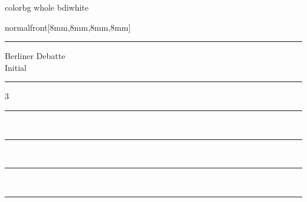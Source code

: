 \documentclass[
    coverwidth=160mm,
    coverheight=227mm,
    spinewidth=9mm,
    markcolor=black,
    marklength=8mm,
    trimmed=true,
    ]
    {bookcover}
\begin{document}
    \begin{bookcover}
        \begin{bookcoverelement}{color}{bg whole}
        bdiwhite
        \end{bookcoverelement}
        
        \begin{bookcoverelement}{normal}{front}[8mm,8mm,8mm,8mm]
            \hrule
            \begin{center}
                {\bdilogo Berliner Debatte\\Initial\par}
            \end{center}
            \hrule
            \begin{center}
                \vspace{10pt}
                {\bdinumber \color{bdired} 3}
                \vspace{10pt}
            \end{center}
       
            \par\noindent\rule{72mm}{0.4pt}\\
            {\bdivolume{\color{bdired} {33. Jg. 2022}}}
            \begin{center}
                \bdicover {\bfseries \bdiTitle}
            \end{center}
            \bigskip
            
            \hspace{72mm}\noindent\rule{72mm}{0.4pt}\\\bigskip
            \hfill{\bdivolume{\autorEins}}
            \begin{center}
                \bdicover \artikelEins
            \end{center}
            \bigskip

            \par\noindent\rule{72mm}{0.4pt}\\
            {\bdivolume{\autorZwei}}
            \begin{center}
                \bdicover \artikelZwei
            \end{center}
            \bigskip

            \hspace{72mm}\noindent\rule{72mm}{0.4pt}\\\bigskip
            \hfill{\bdivolume{\autorDrei}}
            \begin{center}
                \bdicover \artikelDrei
            \end{center}
            \bigskip


\end{bookcoverelement}
\end{bookcover}
\end{document}
